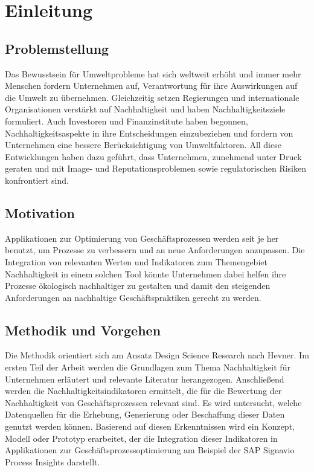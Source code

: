 \chapter{Einleitung}

\section{Problemstellung}

Das Bewusstsein für Umweltprobleme hat sich weltweit erhöht und immer mehr Menschen fordern Unternehmen auf, Verantwortung für ihre Auswirkungen auf die Umwelt zu übernehmen.
Gleichzeitig setzen Regierungen und internationale Organisationen verstärkt auf Nachhaltigkeit und haben Nachhaltigkeitsziele formuliert.
Auch Investoren und Finanzinstitute haben begonnen, Nachhaltigkeitsaspekte in ihre Entscheidungen einzubeziehen und fordern von Unternehmen eine bessere Berücksichtigung von Umweltfaktoren.
All diese Entwicklungen haben dazu geführt, dass Unternehmen, zunehmend unter Druck geraten und mit Image- und Reputationsproblemen sowie regulatorischen Risiken konfrontiert sind. 

\section{Motivation}

Applikationen zur Optimierung von Geschäftsprozessen werden seit je her benutzt, um Prozesse zu verbessern und an neue Anforderungen anzupassen.
Die Integration von relevanten Werten und Indikatoren zum Themengebiet Nachhaltigkeit in einem solchen Tool könnte Unternehmen dabei helfen
ihre Prozesse ökologisch nachhaltiger zu gestalten und damit den steigenden Anforderungen an nachhaltige Geschäftspraktiken gerecht zu werden.

\section{Methodik und Vorgehen}

Die Methodik orientiert sich am Ansatz Design Science Research nach Hevner.
Im ersten Teil der Arbeit werden die Grundlagen zum Thema Nachhaltigkeit für Unternehmen erläutert und relevante Literatur herangezogen.
Anschließend werden die Nachhaltigkeitsindikatoren ermittelt, die für die Bewertung der Nachhaltigkeit von Geschäftsprozessen relevant sind.
Es wird untersucht, welche Datenquellen für die Erhebung, Generierung oder Beschaffung dieser Daten genutzt werden können.
Basierend auf diesen Erkenntnissen wird ein Konzept, Modell oder Prototyp erarbeitet,
der die Integration dieser Indikatoren in Applikationen zur Geschäftsprozessoptimierung am Beispiel der SAP Signavio Process Insights darstellt.